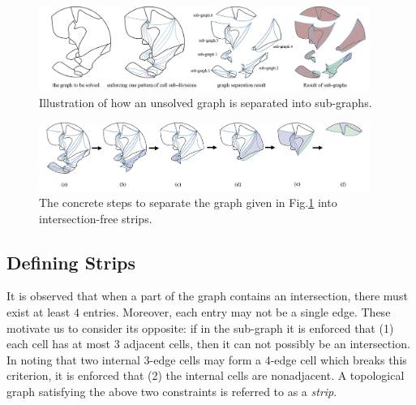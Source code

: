 \documentclass[conference]{IEEEtran}
\begin{document}

\begin{figure}[t]
\centering
\includegraphics[width =0.96\textwidth]{figures/graph_separation_2}
\caption{Illustration of how an unsolved graph is separated into sub-graphs. }\label{fig:complicated_graph}
\end{figure}

\begin{figure}[t]
\centering
\includegraphics[width=0.96\textwidth]{figures/steps}
\caption{The concrete steps to separate the graph given in Fig.\ref{fig:complicated_graph} into intersection-free strips. }\label{fig:steps}
\end{figure}


\subsection{Defining Strips}
It is observed that when a part of the graph contains an intersection, there must exist at least $4$ entries. Moreover, each entry may not be a single edge.  
These motivate us to consider its opposite: if in the sub-graph it is enforced that (1) each cell has at most $3$ adjacent cells, then it can not possibly be an intersection. In noting that two internal $3$-edge cells may form a $4$-edge cell which breaks this criterion, it is enforced that (2) the internal cells are nonadjacent. 
A topological graph satisfying the above two constraints is referred to as a \textit{strip}. 
\end{document}
